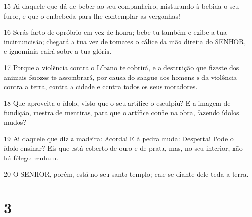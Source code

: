 \par 15 Ai daquele que dá de beber ao seu companheiro, misturando à bebida o seu furor, e que o embebeda para lhe contemplar as vergonhas!
\par 16 Serás farto de opróbrio em vez de honra; bebe tu também e exibe a tua incircuncisão; chegará a tua vez de tomares o cálice da mão direita do SENHOR, e ignomínia cairá sobre a tua glória.
\par 17 Porque a violência contra o Líbano te cobrirá, e a destruição que fizeste dos animais ferozes te assombrará, por causa do sangue dos homens e da violência contra a terra, contra a cidade e contra todos os seus moradores.
\par 18 Que aproveita o ídolo, visto que o seu artífice o esculpiu? E a imagem de fundição, mestra de mentiras, para que o artífice confie na obra, fazendo ídolos mudos?
\par 19 Ai daquele que diz à madeira: Acorda! E à pedra muda: Desperta! Pode o ídolo ensinar? Eis que está coberto de ouro e de prata, mas, no seu interior, não há fôlego nenhum.
\par 20 O SENHOR, porém, está no seu santo templo; cale-se diante dele toda a terra.

\chapter{3}

